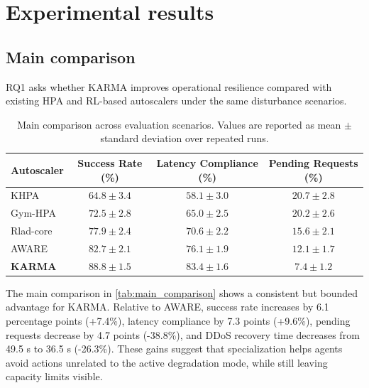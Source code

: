 \documentclass[journal]{IEEEtran}
\begin{document}

\section{Experimental results}
\label{sec:results}

\subsection{Main comparison}

RQ1 asks whether KARMA improves operational resilience compared with existing HPA and RL-based autoscalers under the same disturbance scenarios.
%
\begin{table}[t]
  \centering
  \caption{Main comparison across evaluation scenarios. Values are reported as mean $\pm$ standard deviation over repeated runs.}
  \label{tab:main_comparison}
  \footnotesize
  \setlength{\tabcolsep}{5pt}
  \begin{tabular}{lccc}
    \toprule
    \textbf{Autoscaler} & \textbf{Success Rate (\%)} & \textbf{Latency Compliance (\%)} & \textbf{Pending Requests (\%)} \\
    \midrule
    KHPA                & $64.8\pm3.4$               & $58.1\pm3.0$                     & $20.7\pm2.8$                   \\
    Gym-HPA             & $72.5\pm2.8$               & $65.0\pm2.5$                     & $20.2\pm2.6$                   \\
    Rlad-core           & $77.9\pm2.4$               & $70.6\pm2.2$                     & $15.6\pm2.1$                   \\
    AWARE               & $82.7\pm2.1$               & $76.1\pm1.9$                     & $12.1\pm1.7$                   \\
    \textbf{KARMA}      & $\mathbf{88.8\pm1.5}$      & $\mathbf{83.4\pm1.6}$            & $\mathbf{7.4\pm1.2}$           \\
    \bottomrule
  \end{tabular}
\end{table}
%
The main comparison in \autoref{tab:main_comparison} shows a consistent but bounded advantage for KARMA. Relative to AWARE, success rate increases by 6.1 percentage points (+7.4\%), latency compliance by 7.3 points (+9.6\%), pending requests decrease by 4.7 points (-38.8\%), and DDoS recovery time decreases from 49.5 s to 36.5 s (-26.3\%). These gains suggest that specialization helps agents avoid actions unrelated to the active degradation mode, while still leaving capacity limits visible.
\end{document}
